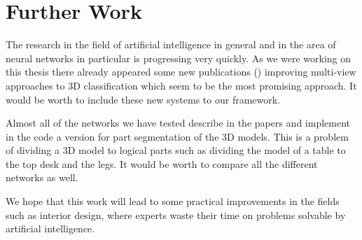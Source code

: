 \section{Further Work}
The research in the field of artificial intelligence in general and in the area of neural networks in particular is progressing very quickly. As we were working on this thesis there already appeared some new publications (\cite{yu_multi-view_2018, you_pvnet:_2018, feng_gvcnn:_2018}) improving multi-view approaches to 3D classification which seem to be the most promising approach. It would be worth to include these new systems to our framework. \par
Almost all of the networks we have tested describe in the papers and implement in the code a version for part segmentation of the 3D models. This is a problem of dividing a 3D model to logical parts such as dividing the model of a table to the top desk and the legs. It would be worth to compare all the different networks as well.\par
We hope that this work will lead to some practical improvements in the fields such as interior design, where experts waste their time on problems solvable by artificial intelligence. 
